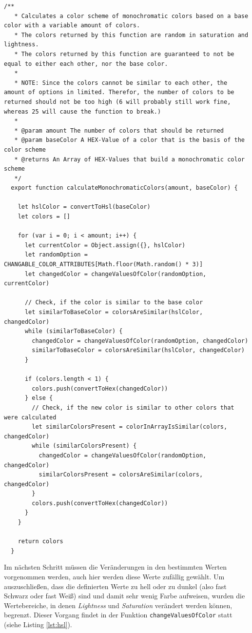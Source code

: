 \begin{lstlisting}[caption=Berechnung eines Monochromatischen Farbschemas, label=lst:mono]
  /**
   * Calculates a color scheme of monochromatic colors based on a base color with a variable amount of colors.
   * The colors returned by this function are random in saturation and lightness.
   * The colors returned by this function are guaranteed to not be equal to either each other, nor the base color.
   *
   * NOTE: Since the colors cannot be similar to each other, the amount of options in limited. Therefor, the number of colors to be returned should not be too high (6 will probably still work fine, whereas 25 will cause the function to break.)
   *
   * @param amount The number of colors that should be returned
   * @param baseColor A HEX-Value of a color that is the basis of the color scheme
   * @returns An Array of HEX-Values that build a monochromatic color scheme
   */
  export function calculateMonochromaticColors(amount, baseColor) {

    let hslColor = convertToHsl(baseColor)
    let colors = []

    for (var i = 0; i < amount; i++) {
      let currentColor = Object.assign({}, hslColor)
      let randomOption = CHANGABLE_COLOR_ATTRIBUTES[Math.floor(Math.random() * 3)]
      let changedColor = changeValuesOfColor(randomOption, currentColor)

      // Check, if the color is similar to the base color
      let similarToBaseColor = colorsAreSimilar(hslColor, changedColor)
      while (similarToBaseColor) {
        changedColor = changeValuesOfColor(randomOption, changedColor)
        similarToBaseColor = colorsAreSimilar(hslColor, changedColor)
      }

      if (colors.length < 1) {
        colors.push(convertToHex(changedColor))
      } else {
        // Check, if the new color is similar to other colors that were calculated
        let similarColorsPresent = colorInArrayIsSimilar(colors, changedColor)
        while (similarColorsPresent) {
          changedColor = changeValuesOfColor(randomOption, changedColor)
          similarColorsPresent = colorsAreSimilar(colors, changedColor)
        }
        colors.push(convertToHex(changedColor))
      }
    }

    return colors
  }
\end{lstlisting}

Im nächsten Schritt müssen die Veränderungen in den bestimmten Werten vorgenommen werden, auch hier werden diese Werte zufällig gewählt. Um auszuschließen, dass die definierten Werte zu hell oder zu dunkel (also fast Schwarz oder fast Weiß) sind und damit sehr wenig Farbe aufweisen, wurden die Wertebereiche, in denen \textit{Lightness} und \textit{Saturation} verändert werden können, begrenzt. Dieser Vorgang findet in der Funktion \texttt{changeValuesOfColor} statt (siehe Listing \ref{lst:hsl}).

